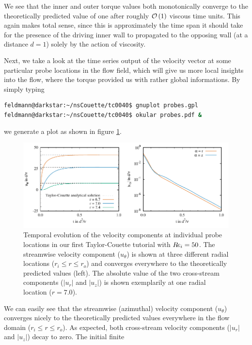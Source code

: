 \documentclass[a4paper, 11pt, DIV=11]{scrartcl}
\begin{document}
We see that the inner and outer torque values both monotonically converge to the 
theoretically predicted value of one after roughly $\mathcal{O}\left(1\right)$ 
viscous time units. This again makes total sense, since this is approximately 
the time span it should take for the presence of the driving inner wall to 
propagated to the opposing wall (at a distance $d=1$) solely by the action of 
viscosity. %
\par Next, we take a 
look at the time series output of the velocity vector at some particular probe 
locations in the flow field, which will give us more local insights into the 
flow, where the torque provided us with rather global informations. By simply 
typing
\begin{lstlisting}[language=bash]
feldmann@darkstar:~/nsCouette/tc0040$ gnuplot probes.gpl
feldmann@darkstar:~/nsCouette/tc0040$ okular probes.pdf &
\end{lstlisting}
we generate a plot as shown in figure \ref{fig:tc0040probes}.
\begin{figure}[htb]
\centering
\includegraphics[scale=1.00]{figures/tc0040/probes}
\caption{Temporal evolution of the velocity components at individual probe 
locations in our first Taylor-Couette tutorial  with $R\hspace{-0.1em}e_{i}=\num{50}$.
The streamwise velocity component ($u_{\theta}$) is shown 
at three different radial locations ($r_{i}\le r\le r_{o}$) and converges 
everywhere to the theoretically predicted values (left). The absolute value of
the two cross-stream components ($|u_r|$ and $|u_z|$) is shown exemplarily at
one radial location ($r=\num{7.0}$).}
\label{fig:tc0040probes}
\end{figure}
We can easily see that the streamwise (azimuthal) velocity component 
($u_{\theta}$) converges nicely to the theoretically predicted values everywhere 
in the flow domain ($r_{i}\le r\le r_{o}$). As expected, both cross-stream 
velocity components ($|u_r|$ and $|u_z|$) decay to zero. The initial finite 
\end{document}
